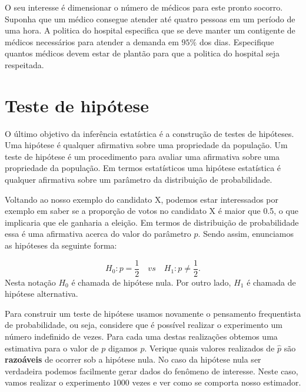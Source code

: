 \documentclass[10pt,a4paper]{book}
\begin{document}
O seu interesse é dimensionar o número de médicos para este pronto
socorro. Suponha que um médico consegue atender até quatro pessoas em um
período de uma hora. A politica do hospital especifica que se deve
manter um contigente de médicos necessários para atender a demanda em
\(95\%\) dos dias. Especifique quantos médicos devem estar de plantão
para que a politica do hospital seja respeitada.

\section{Teste de hipótese}\label{teste-de-hipuxf3tese}

O último objetivo da inferência estatística é a construção de testes de
hipóteses. Uma hipótese é qualquer afirmativa sobre uma propriedade da
população. Um teste de hipótese é um procedimento para avaliar uma
afirmativa sobre uma propriedade da população. Em termos estatísticos
uma hipótese estatística é qualquer afirmativa sobre um parâmetro da
distribuição de probabilidade.

Voltando ao nosso exemplo do candidato X, podemos estar interessados por
exemplo em saber se a proporção de votos no candidato X é maior que 0.5,
o que implicaria que ele ganharia a eleição. Em termos de distribuição
de probabilidade essa é uma afirmativa acerca do valor do parâmetro
\(p\). Sendo assim, enunciamos as hipóteses da seguinte forma:

\[H_0: p = \frac{1}{2} \quad vs \quad H_1: p \neq \frac{1}{2}.\] Nesta
notação \(H_0\) é chamada de hipótese nula. Por outro lado, \(H_1\) é
chamada de hipótese alternativa.

Para construir um teste de hipótese usamos novamente o pensamento
frequentista de probabilidade, ou seja, considere que é possível
realizar o experimento um número indefinido de vezes. Para cada uma
destas realizações obtemos uma estimativa para o valor de \(p\) digamos
\(\hat{p}\). Verique quais valores realizados de \(\hat{p}\) são
\textbf{razoáveis} de ocorrer sob a hipótese nula. No caso da hipótese
nula ser verdadeira podemos facilmente gerar dados do fenômeno de
interesse. Neste caso, vamos realizar o experimento \(1000\) vezes e ver
como se comporta nosso estimador.
\end{document}

